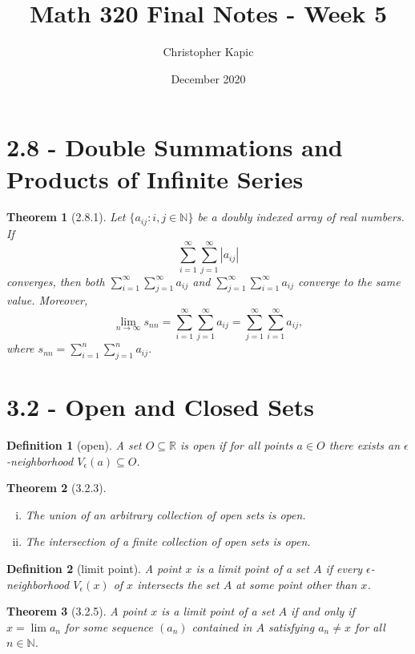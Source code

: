 \documentclass{article}
\title{Math 320 Final Notes - Week 5}
\author{Christopher Kapic}
\date{December 2020}
\newtheorem{definition}{Definition}
\newtheorem{theorem}{Theorem}
\begin{document}
\maketitle

\section*{2.8 - Double Summations and Products of Infinite Series}

\begin{theorem}[2.8.1]
    Let $\{a_{ij}:i,j \in \mathbb{N}\}$ be a doubly indexed array of real numbers. If \[\sum _{i=1}^\infty \sum _{j=1}^\infty |a_{ij}|\] converges, then both $\sum _{i=1}^\infty \sum _{j=1}^\infty a_{ij}$ and $\sum _{j=1}^\infty \sum _{i=1}^\infty a_{ij}$ converge to the same value. Moreover, \[\lim _{n\rightarrow \infty} s_{nn}=\sum _{i=1}^\infty \sum _{j=1}^\infty a_{ij}=\sum _{j=1}^\infty \sum _{i=1}^\infty a_{ij},\] where $s_{nn}=\sum _{i=1}^n \sum _{j=1}^n a_{ij}$.
\end{theorem}




\section*{3.2 - Open and Closed Sets}
\begin{definition}[open]
    A set $O \subseteq \mathbb{R}$ is \textit{open} if for all points $a \in O$ there exists an $\epsilon$-neighborhood $V_\epsilon (a) \subseteq O$.
\end{definition}

\begin{theorem}[3.2.3]
    \begin{enumerate}[(i)]
        \item The union of an arbitrary collection of open sets is open.
        \item The intersection of a finite collection of open sets is open.
    \end{enumerate}
\end{theorem}

\begin{definition}[limit point]
    A point $x$ is a \textit{limit point} of a set $A$ if every $\epsilon$-neighborhood $V_\epsilon (x)$ of $x$ intersects the set $A$ at some point other than $x$.
\end{definition}

\begin{theorem}[3.2.5]
    A point $x$ is a limit point of a set $A$ if and only if $x = \lim a_n$ for some sequence $(a_n)$ contained in $A$ satisfying $a_n \neq x$ for all $n \in \mathbb{N}$.
\end{theorem}
\end{document}
